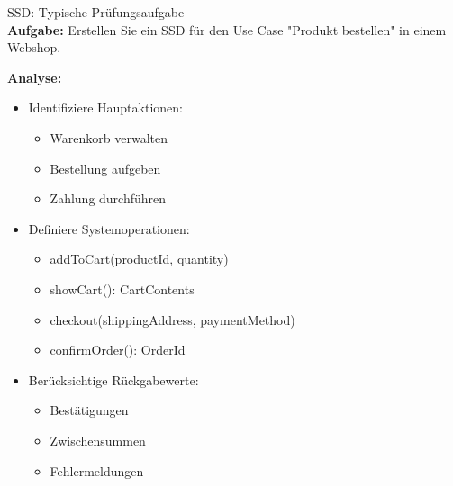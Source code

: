 \begin{example2}{SSD: Typische Prüfungsaufgabe}\\
\textbf{Aufgabe:} Erstellen Sie ein SSD für den Use Case "Produkt bestellen" in einem Webshop.

\textbf{Analyse:}
\begin{itemize}
    \item Identifiziere Hauptaktionen:
    \begin{itemize}
        \item Warenkorb verwalten
        \item Bestellung aufgeben
        \item Zahlung durchführen
    \end{itemize}
    
    \item Definiere Systemoperationen:
    \begin{itemize}
        \item addToCart(productId, quantity)
        \item showCart(): CartContents
        \item checkout(shippingAddress, paymentMethod)
        \item confirmOrder(): OrderId
    \end{itemize}
    
    \item Berücksichtige Rückgabewerte:
    \begin{itemize}
        \item Bestätigungen
        \item Zwischensummen
        \item Fehlermeldungen
    \end{itemize}
\end{itemize}

\end{example2}

